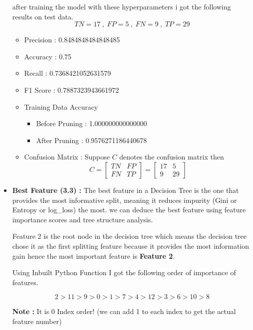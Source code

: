 \documentclass{article}
\begin{document}
\begin{itemize}
    after training the model with these hyperparameters i got the following results on test data. 
    \[TN = 17 \hspace{3pt},\hspace{3pt} FP = 5 \hspace{3pt},\hspace{3pt} FN = 9 \hspace{3pt} , \hspace{3pt} TP = 29 \]
    \begin{itemize}
        \item Precision : 0.8484848484848485 
        \item Accuracy : 0.75
        \item Recall : 0.7368421052631579
        \item F1 Score : 0.7887323943661972
        \item Training Data Accuracy
        \begin{itemize}
            \item Before Pruning : 1.000000000000000
            \item After Pruning : 0.9576271186440678
        \end{itemize}
        \item Confusion Matrix : Suppose $C$ denotes the confusion matrix then
        \[C = \begin{bmatrix}
            TN & FP \\
            FN & TP
        \end{bmatrix} = \begin{bmatrix}
            17 & 5 \\
            9 & 29
        \end{bmatrix}\]
    \end{itemize}

    \item \textbf{Best Feature (3.3) :} The best feature in a Decision Tree is the one that provides the most informative split, meaning it reduces impurity (Gini or Entropy or log\_loss) the most. we can deduce the best feature using feature importance scores and tree structure analysis.
    
    Feature 2 is the root node in the decision tree which means the decision tree chose it as the first splitting feature because it provides the most information gain hence the most important feature is \textbf{Feature 2}.

    Using Inbuilt Python Function  I got the following order of importance of features.

    \[ 2 > 11 > 9 > 0 > 1 > 7 > 4 > 12 > 3 > 6 > 10 > 8\]

    \textbf{Note : }It is 0 Index order! (we can add 1 to each index to get the actual feature number)
\end{itemize}

\vspace{1cm}

\begin{center}
\end{center}
\end{document}
